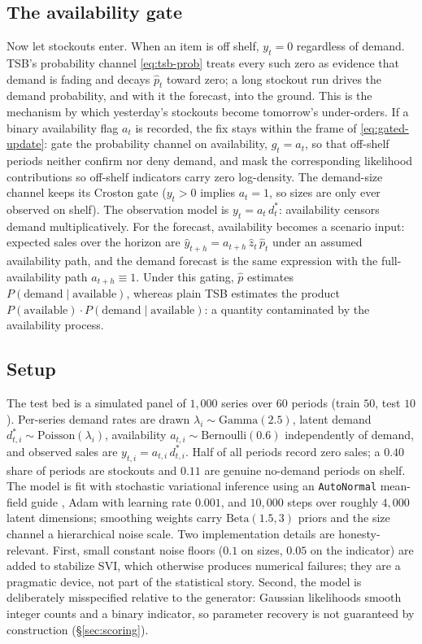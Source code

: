 \subsection{The availability gate}\label{sec:availability-gate}

Now let stockouts enter. When an item is off shelf, $y_t = 0$ regardless of demand. TSB's probability channel \eqref{eq:tsb-prob} treats every such zero as evidence that demand is fading and decays $\hat{p}_t$ toward zero; a long stockout run drives the demand probability, and with it the forecast, into the ground. This is the mechanism by which yesterday's stockouts become tomorrow's under-orders. If a binary availability flag $a_t$ is recorded, the fix stays within the frame of \eqref{eq:gated-update}: gate the probability channel on availability, $g_t = a_t$, so that off-shelf periods neither confirm nor deny demand, and mask the corresponding likelihood contributions so off-shelf indicators carry zero log-density. The demand-size channel keeps its Croston gate ($y_t > 0$ implies $a_t = 1$, so sizes are only ever observed on shelf). The observation model is $y_t = a_t \, d^{*}_t$: availability censors demand multiplicatively. For the forecast, availability becomes a scenario input: expected sales over the horizon are $\hat{y}_{t+h} = a_{t+h} \, \hat{z}_t \, \hat{p}_t$ under an assumed availability path, and the demand forecast is the same expression with the full-availability path $a_{t+h} \equiv 1$. Under this gating, $\hat{p}$ estimates $P(\text{demand} \mid \text{available})$, whereas plain TSB estimates the product $P(\text{available}) \cdot P(\text{demand} \mid \text{available})$: a quantity contaminated by the availability process.

\subsection{Setup}\label{sec:cs1-setup}

The test bed is a simulated panel of $1{,}000$ series over $60$ periods (train $50$, test $10$). Per-series demand rates are drawn $\lambda_i \sim \text{Gamma}(2.5)$, latent demand $d^{*}_{t,i} \sim \text{Poisson}(\lambda_i)$, availability $a_{t,i} \sim \text{Bernoulli}(0.6)$ independently of demand, and observed sales are $y_{t,i} = a_{t,i} \, d^{*}_{t,i}$. Half of all periods record zero sales; a $0.40$ share of periods are stockouts and $0.11$ are genuine no-demand periods on shelf. The model is fit with stochastic variational inference \citep{hoffman2013stochastic} using an \texttt{AutoNormal} mean-field guide \citep{kucukelbir2017automatic}, Adam with learning rate $0.001$, and $10{,}000$ steps over roughly $4{,}000$ latent dimensions; smoothing weights carry $\text{Beta}(1.5, 3)$ priors and the size channel a hierarchical noise scale. Two implementation details are honesty-relevant. First, small constant noise floors ($0.1$ on sizes, $0.05$ on the indicator) are added to stabilize SVI, which otherwise produces numerical failures; they are a pragmatic device, not part of the statistical story. Second, the model is deliberately misspecified relative to the generator: Gaussian likelihoods smooth integer counts and a binary indicator, so parameter recovery is not guaranteed by construction (\S\ref{sec:scoring}).

